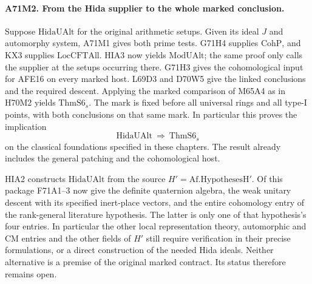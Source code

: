 \paragraph{A71M2. From the Hida supplier to the whole marked conclusion.}
Suppose $\mathrm{HidaUAlt}$ for the original arithmetic
setups. Given its ideal $J$ and automorphy system, A71M1
gives both prime tests. G71H4 supplies $\mathrm{CohP}$,
and KX3 supplies $\mathrm{LocCFTAll}$. HIA3 now yields
$\mathrm{ModUAlt}$; the same proof only calls the supplier at the
setups occurring there. G71H3 gives the cohomological input for
AFE16 on every marked host. L69D3 and D70W5 give the linked
conclusions and the required descent. Applying the marked comparison
of M65A4 as in H70M2 yields
$\mathrm{ThmS6}_s$. The mark is fixed before all universal rings
and all type-I points, with both conclusions on that same mark.
In particular this proves the implication
\[
          \mathrm{HidaUAlt}\ \Longrightarrow\ \mathrm{ThmS6}_s
\]
on the classical foundations specified in these chapters.
The result already includes the general patching and the
cohomological host.

HIA2 constructs $\mathrm{HidaUAlt}$ from the source
$H'=\mathrm{Af.HypothesesH}'$. Of this package F71A1--3 now give
the definite quaternion algebra, the weak unitary descent with
its specified inert-place vectors, and the entire cohomology
entry of the rank-general literature hypothesis. The latter is
only one of that hypothesis's four entries. In particular the
other local representation theory, automorphic and CM entries
and the other fields of $H'$ still require verification in
their precise formulations, or a direct construction of the
needed Hida ideals. Neither alternative is a premise of the
original marked contract. Its status therefore remains open.
